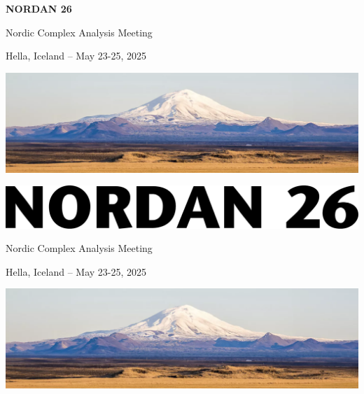 \documentclass[12pt,openany]{report}      %
\def\TITLE{NORDAN 26}
\def\SUBTITLE{Nordic Complex Analysis Meeting}
\def\LOCATION{Hella, Iceland -- May 23-25, 2025}
\begin{document}
\begin{titlepage}
	\centering
    {\textbf{\textsf{\fontsize{63}{18}\selectfont \TITLE}}\par}
	\vspace{0.5cm}
	{\Huge \textsf{\SUBTITLE}\par}
	\vspace{0.5cm}
	{\Large \LOCATION\par}
	\vspace{2cm}
	\vfill
    \includegraphics[width=1\textwidth]{figs/cover}\par\vspace{1cm}
\end{titlepage}
\begin{titlepage}
	\centering
                        \includegraphics[scale = 0.45]{figs/title1} \\
	\vspace{0.5cm}
	{\Huge \textsf{\SUBTITLE}\par}
	\vspace{0.5cm}
	{\Large \LOCATION\par}
	\vspace{2cm}
	\vfill
    \includegraphics[width=1\textwidth]{figs/cover}\par\vspace{1cm}
\end{titlepage}
\end{document}
